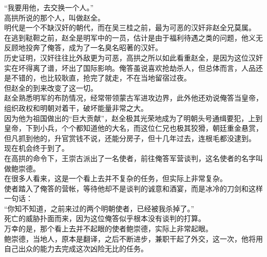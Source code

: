 \begin{multicols}{\theparacolNo}
“我要用他，去交换一个人。”\\

高拱所说的那个人，叫做赵全。\\

明代是一个不缺汉奸的朝代，而在吴三桂之前，最为可恶的汉奸非赵全兄莫属。\\

在逃到鞑靼之前，赵全是明军中的一员，估计是由于福利待遇之类的问题，他义无反顾地投奔了俺答，成为了一名臭名昭著的汉奸。\\

历史证明，汉奸往往比外敌更为可恶，高拱之所以如此看重赵全，是因为这位汉奸实在坏得离了谱，坏出了国际影响。俺答虽说喜欢抢劫杀人，但总体而言，人品还是不错的，也比较耿直，抢完了就走，不在当地留宿过夜。\\

但赵全的到来改变了这一切。\\

赵全熟悉明军的布防情况，经常带领蒙古军进攻边界，此外他还劝说俺答当皇帝，组织政权和明朝对着干，破坏能量非常之大。\\

因为他为祖国做出的“巨大贡献”，赵全极其光荣地成为了明朝头号通缉要犯，上到皇帝，下到小兵，个个都知道他的大名，而这位仁兄也极其狡猾，朝廷重金悬赏，但凡抓到他的，升官赏钱不说，还能分房子，但十几年过去，连根毛都没逮到。\\

现在机会终于到了。\\

在高拱的命令下，王崇古派出了一名使者，前往俺答军营谈判，这名使者的名字叫做鲍崇德。\\

在很多人看来，这是一个看上去并不复杂的任务，但实际上非常复杂。\\

使者踏入了俺答的营帐，等待他却不是谈判的诚意和酒宴，而是冰冷的刀剑和这样一句话：\\

“你知不知道，之前来过的两个明朝使者，已经被我杀掉了。”\\

死亡的威胁扑面而来，因为这位俺答似乎根本没有谈判的打算。\\

万幸的是，那个看上去并不起眼的使者鲍崇德，实际上非常起眼。\\

鲍崇德，当地人，原本是翻译，之后不断进步，兼职干起了外交，这一次，他将用自己出众的能力去完成这次凶险无比的任务。\\


\end{multicols}

